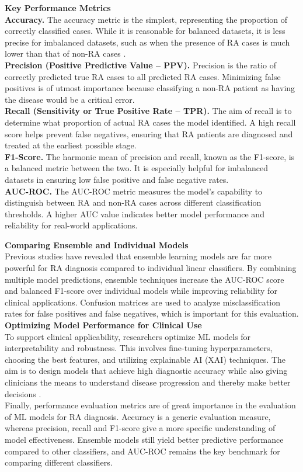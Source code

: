 \documentclass[10pt]{NSP1}
\begin{document}
	\textbf{Key Performance Metrics}\\
	\textbf{Accuracy.} The accuracy metric is the simplest, representing the proportion of correctly classified cases. While it is reasonable for balanced datasets, it is less precise for imbalanced datasets, such as when the presence of RA cases is much lower than that of non-RA cases \cite{venugopalan2021multimodal}.\\
	\textbf{Precision (Positive Predictive Value -- PPV).} Precision is the ratio of correctly predicted true RA cases to all predicted RA cases. Minimizing false positives is of utmost importance because classifying a non-RA patient as having the disease would be a critical error.\\
	\textbf{Recall (Sensitivity or True Positive Rate -- TPR).} The aim of recall is to determine what proportion of actual RA cases the model identified. A high recall score helps prevent false negatives, ensuring that RA patients are diagnosed and treated at the earliest possible stage.\\
	\textbf{F1-Score.} The harmonic mean of precision and recall, known as the F1-score, is a balanced metric between the two. It is especially helpful for imbalanced datasets in ensuring low false positive and false negative rates.\\
	\textbf{AUC-ROC.} The AUC-ROC metric measures the model's capability to distinguish between RA and non-RA cases across different classification thresholds. A higher AUC value indicates better model performance and reliability for real-world applications.
	
	\textbf{Comparing Ensemble and Individual Models}\\
	Previous studies have revealed that ensemble learning models are far more powerful for RA diagnosis compared to individual linear classifiers. By combining multiple model predictions, ensemble techniques increase the AUC-ROC score and balanced F1-score over individual models while improving reliability for clinical applications. Confusion matrices are used to analyze misclassification rates for false positives and false negatives, which is important for this evaluation.\\
	\textbf{Optimizing Model Performance for Clinical Use}\\
	To support clinical applicability, researchers optimize ML models for interpretability and robustness. This involves fine-tuning hyperparameters, choosing the best features, and utilizing explainable AI (XAI) techniques. The aim is to design models that achieve high diagnostic accuracy while also giving clinicians the means to understand disease progression and thereby make better decisions \cite{aliper2023prediction}.\\
	Finally, performance evaluation metrics are of great importance in the evaluation of ML models for RA diagnosis. Accuracy is a generic evaluation measure, whereas precision, recall and F1-score give a more specific understanding of model effectiveness. Ensemble models still yield better predictive performance compared to other classifiers, and AUC-ROC remains the key benchmark for comparing different classifiers.
	
\end{document}
